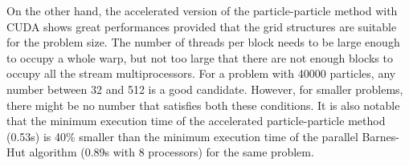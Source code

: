 \documentclass[10pt,journal,compsocconf]{IEEEtran}
\begin{document}
On the other hand, the accelerated version of the particle-particle method with CUDA shows great performances provided that the grid structures are suitable for the problem size. The number of threads per block needs to be large enough to occupy a whole warp, but not too large that there are not enough blocks to occupy all the stream multiprocessors. For a problem with 40000 particles, any number between 32 and 512 is a good candidate. However, for smaller problems, there might be no number that satisfies both these conditions. It is also notable that the minimum execution time of the accelerated particle-particle method (0.53s) is 40\% smaller than the minimum execution time of the parallel Barnes-Hut algorithm (0.89s with 8 processors) for the same problem.
\end{document}
